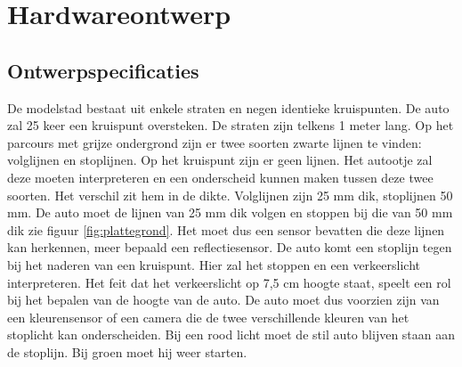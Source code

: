 \documentclass[a4paper,twoside,kulak]{kulakreport} %
\begin{document}
\section{Hardwareontwerp} \label{Hardwareontwerp}

\subsection{Ontwerpspecificaties} \label{Ontwerpspecificaties}


De modelstad bestaat uit enkele straten en negen identieke kruispunten. De auto zal 25 keer een kruispunt oversteken. De straten zijn telkens 1 meter lang. Op het parcours met grijze ondergrond zijn er twee soorten zwarte lijnen te vinden: volglijnen en stoplijnen. Op het kruispunt zijn er geen lijnen. Het autootje zal deze moeten interpreteren en een onderscheid kunnen maken tussen deze twee soorten. Het verschil zit hem in de dikte. Volglijnen zijn 25 mm dik, stoplijnen 50 mm. De auto moet de lijnen van 25 mm dik volgen en stoppen bij die van 50 mm dik zie figuur \ref{fig:plattegrond}. Het moet dus een sensor bevatten die deze lijnen kan herkennen, meer bepaald een reflectiesensor. De auto komt een stoplijn tegen bij het naderen van een kruispunt. Hier zal het stoppen en een verkeerslicht interpreteren. Het feit dat het verkeerslicht op 7,5 cm hoogte staat, speelt een rol bij het bepalen van de hoogte van de auto. De auto moet dus voorzien zijn van een kleurensensor of een camera die de twee verschillende kleuren van het stoplicht kan onderscheiden. Bij een rood licht moet de stil auto blijven staan aan de stoplijn. Bij groen moet hij weer starten. 
\end{document}
